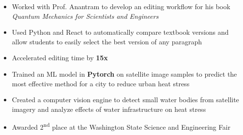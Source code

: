 \documentclass[9pt,a4paper,ragged2e]{altacv}
\begin{document}
\divider

\begin{itemize} \itemsep 0pt  %
  \item Worked with Prof. Anantram to develop an editing workflow for his book \textit{Quantum Mechanics for Scientists and Engineers}
  \item Used Python and React to automatically compare textbook versions and allow students to easily select the best version of any paragraph
   \item Accelerated editing time by \textbf{15x}
\end{itemize}



\begin{itemize} \itemsep 0pt
    \item Trained an ML model in \textbf{Pytorch} on satellite image samples to predict the most effective method for a city to reduce urban heat stress
    \item Created a computer vision engine to detect small water bodies from satellite imagery and analyze effects of water infrastructure on heat stress
    \item Awarded 2\textsuperscript{nd} place at the Washington State Science and Engineering Fair
\end{itemize}

\divider

\end{document}
